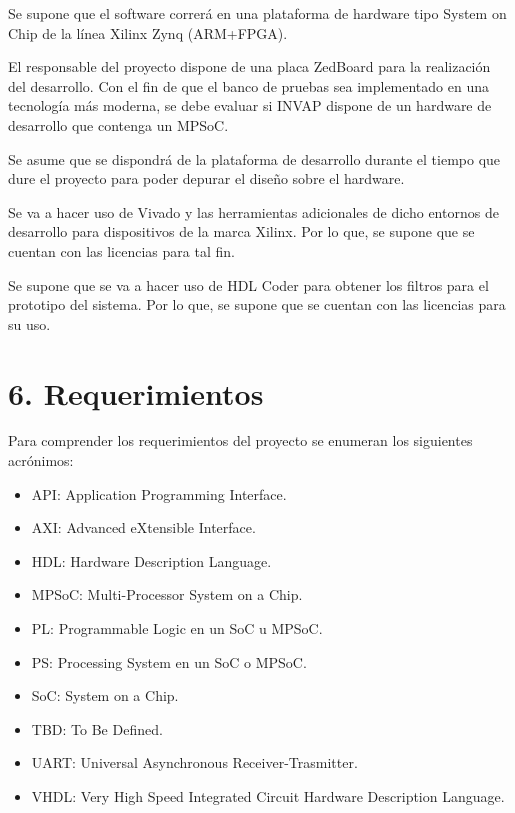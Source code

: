\documentclass[
11pt, %
]{charter}
\begin{document}
Se supone que el software correrá en una plataforma de hardware tipo System on Chip de la línea Xilinx Zynq (ARM+FPGA).

El responsable del proyecto dispone de una placa ZedBoard para la realización del desarrollo. Con el fin de que el banco de pruebas sea implementado en una tecnología más moderna, se debe evaluar si INVAP dispone de un hardware de desarrollo que contenga un MPSoC.

Se asume que se dispondrá de la plataforma de desarrollo durante el tiempo que dure el proyecto para poder depurar el diseño sobre el hardware.

Se va a hacer uso de Vivado y las herramientas adicionales de dicho entornos de desarrollo para dispositivos de la marca Xilinx. Por lo que, se supone que se cuentan con las licencias para tal fin.

Se supone que se va a hacer uso de HDL Coder para obtener los filtros para el prototipo del sistema. Por lo que, se supone que se cuentan con las licencias para su uso.

\clearpage

\section{6. Requerimientos}
\label{sec:requerimientos}

Para comprender los requerimientos del proyecto se enumeran los siguientes acrónimos:

\begin{itemize}
		\item API: Application Programming Interface.
		\item AXI: Advanced eXtensible Interface.
		\item HDL: Hardware Description Language.
		\item MPSoC: Multi-Processor System on a Chip.
		\item PL: Programmable Logic en un SoC u MPSoC.
		\item PS: Processing System en un SoC o MPSoC.
		\item SoC: System on a Chip.
		\item TBD: To Be Defined.
		\item UART: Universal Asynchronous Receiver-Trasmitter.
		\item VHDL: Very High Speed Integrated Circuit Hardware Description Language.
\end{itemize}
\end{document}
